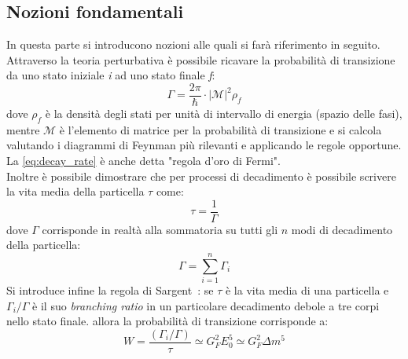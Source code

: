 \documentclass{subnucbo}
\begin{document}
\subsection{Nozioni fondamentali}
In questa parte si introducono nozioni alle quali si farà riferimento in seguito.\\
Attraverso la teoria perturbativa è possibile ricavare la probabilità di transizione da uno stato iniziale \textit{i} ad uno stato finale \textit{f}:
\begin{equation}
        \Gamma = \frac{2 \pi} {\hbar} \cdot | \mathcal{M}|^{2} \rho_{f}
        \label{eq:decay_rate}
\end{equation}
dove $\rho_{f}$ è la densità degli stati per unità di intervallo di energia (spazio delle fasi), mentre $\mathcal{M}$ è l'elemento di matrice per la probabilità di transizione e si calcola valutando i diagrammi di Feynman più rilevanti e applicando le regole opportune. La \ref{eq:decay_rate} è anche detta "regola d'oro di Fermi". \\
Inoltre è possibile dimostrare \cite{ref:griff} che per processi di decadimento è possibile scrivere la vita media della particella $\tau$ come:
\begin{equation}
        \tau = \frac{1}{\Gamma}
        \label{eq:tau}
\end{equation}
dove $\Gamma$ corrisponde in realtà alla sommatoria su tutti gli $n$ modi di decadimento della particella:
\begin{equation}
        \Gamma = \sum _ { i = 1 } ^ { n } \Gamma _ { i }
        \label{eq:gamma_sum}
\end{equation}
Si introduce infine la regola di Sargent~\cite{ref:BGS}: se $\tau$ è la vita media di una particella e $\Gamma_{i}/\Gamma$ è il suo \textit{branching ratio} in un particolare decadimento debole a tre corpi nello stato finale. allora la probabilità di transizione corrisponde a:
\begin{equation}
        W = \frac{(\Gamma_{i}/\Gamma)}{\tau} \simeq G_{F}^{2}E_{0}^{5} \simeq G_{F}^{2}\Delta m^{5}
        \label{eq:sargent_rule}
\end{equation}
\end{document}
